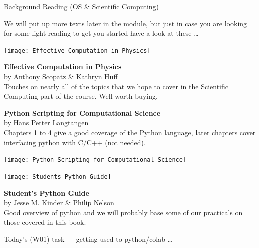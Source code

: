 \documentclass{wit-slides-2020}
\begin{document}
\begin{frame}[label=todo]{Background Reading (OS \& Scientific Computing)}

We will put up more texts later in the module, but just in case you are looking for some light reading to get you started have a look at these \ldots

\vspace{6pt}
\footnotesize
\begin{minipage}{.15\textwidth}
\texttt{[image: Effective\_Computation\_in\_Physics]}
\end{minipage}
\hfill
\begin{minipage}{.8\textwidth}
{\bf Effective Computation in Physics}\\
by Anthony Scopatz \& Kathryn Huff\\
Touches on nearly all of the topics that we hope to cover in the Scientific Computing part of the course.  Well worth buying.
\end{minipage}

\vspace{-12pt}
\begin{minipage}{.8\textwidth}
{\bf Python Scripting for Computational Science}\\
by Hans Petter Langtangen\\
Chapters 1 to 4 give a good coverage of the Python language, later chapters cover interfacing python with C/C++ (not needed). 
\end{minipage}
\begin{minipage}{.15\textwidth}
\texttt{[image: Python\_Scripting\_for\_Computational\_Science]}
\end{minipage}

\vspace{-12pt}
\begin{minipage}{.15\textwidth}
\texttt{[image: Students\_Python\_Guide]}
\end{minipage}
\hfill
\begin{minipage}{.8\textwidth}
{\bf Student's Python Guide}\\
by Jesse M. Kinder \& Philip Nelson\\
Good overview of python and we will probably base some of our practicals on those covered in this book.
\end{minipage}

\end{frame}

\begin{frame}[label=todo]{Today's (W01) task --- getting used to python/colab \ldots}

\begin{center}
\end{center}
\end{frame}
\end{document}
